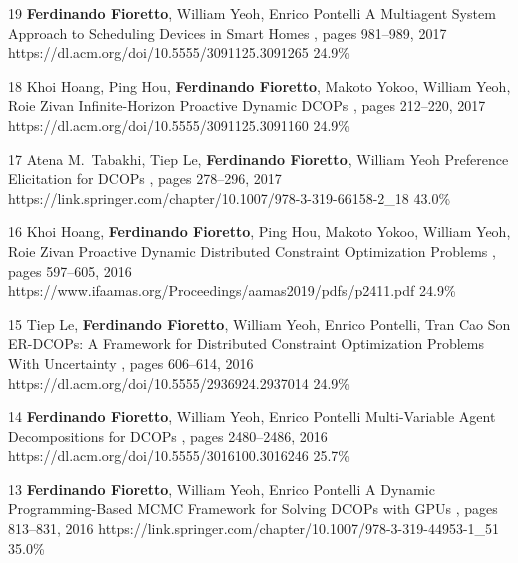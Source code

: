\begin{pubs}
	\confentry 
		{19} %
		{{\bf Ferdinando Fioretto},  William Yeoh, Enrico Pontelli}
		{A Multiagent System Approach to Scheduling Devices in Smart Homes}
		{\procAAMAS, pages 981--989, 2017} 
		{https://dl.acm.org/doi/10.5555/3091125.3091265}
		{24.9\%}%

	\confentry
		{18} %
		{Khoi Hoang, Ping Hou, {\bf Ferdinando Fioretto}, Makoto Yokoo, William Yeoh, Roie Zivan}
		{Infinite-Horizon Proactive Dynamic DCOPs}
		{\procAAMAS, pages 212--220, 2017}
		{https://dl.acm.org/doi/10.5555/3091125.3091160}
		{24.9\%}%

	\confentry 
		{17} %
		{Atena M.~Tabakhi, Tiep Le, {\bf Ferdinando Fioretto}, William Yeoh}
		{Preference Elicitation for DCOPs}
		{\procCP, pages 278--296, 2017}
		{https://link.springer.com/chapter/10.1007/978-3-319-66158-2\_18}
		{43.0\%}%

\confentry 
		{16} %
		{Khoi Hoang, {\bf Ferdinando Fioretto}, Ping Hou, Makoto Yokoo, William Yeoh, Roie Zivan}
		{Proactive Dynamic Distributed Constraint Optimization Problems} 
		{\procAAMAS, pages 597--605, 2016}
		{https://www.ifaamas.org/Proceedings/aamas2019/pdfs/p2411.pdf}
		{24.9\%}%

\confentry 
		{15} %
		{Tiep Le, {\bf Ferdinando Fioretto}, William Yeoh, Enrico Pontelli, Tran Cao Son} 
		{ER-DCOPs: A Framework for Distributed Constraint Optimization Problems With Uncertainty} 
		{\procAAMAS,	pages 606--614, 2016}
		{https://dl.acm.org/doi/10.5555/2936924.2937014}
		{24.9\%}%

\confentry 
		{14} %
		{{\bf Ferdinando Fioretto}, William Yeoh, Enrico Pontelli}
		{Multi-Variable Agent Decompositions for DCOPs}
		{\procAAAI, pages 2480--2486, 2016}
		{https://dl.acm.org/doi/10.5555/3016100.3016246}
		{25.7\%}%

\confentry
		{13} %
		{{\bf Ferdinando Fioretto}, William Yeoh, Enrico Pontelli}
		{A Dynamic Programming-Based MCMC Framework for Solving DCOPs with GPUs}
		{\procCP, pages 813--831,	2016}
		{https://link.springer.com/chapter/10.1007/978-3-319-44953-1\_51}
		{35.0\%}%


\end{pubs}
